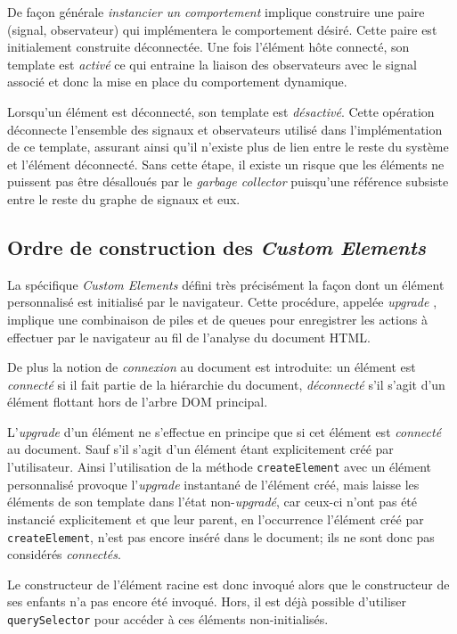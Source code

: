 De façon générale \emph{instancier un comportement} implique construire une paire (signal, observateur) qui implémentera le comportement désiré. Cette paire est initialement construite déconnectée. Une fois l'élément hôte connecté, son template est \emph{activé} ce qui entraine la liaison  des observateurs avec le signal associé et donc la mise en place du comportement dynamique.

Lorsqu'un élément est déconnecté, son template est \emph{désactivé}. Cette opération déconnecte l'ensemble des signaux et observateurs utilisé dans l'implémentation de ce template, assurant ainsi qu'il n'existe plus de lien entre le reste du système et l'élément déconnecté. Sans cette étape, il existe un risque que les éléments ne puissent pas être désalloués par le \emph{garbage collector} puisqu'une référence subsiste entre le reste du graphe de signaux et eux.

\subsection{Ordre de construction des \emph{Custom Elements}}

La spécifique \emph{Custom Elements} \cite{w3c-custom-elements} défini très précisément la façon dont un élément personnalisé est initialisé par le navigateur. Cette procédure, appelée \emph{upgrade} \cite[\small 2.5 Upgrades]{w3c-custom-elements}, implique une combinaison de piles et de queues pour enregistrer les actions à effectuer par le navigateur au fil de l'analyse du document HTML.

De plus la notion de \emph{connexion} au document est introduite: un élément est \emph{connecté} si il fait partie de la hiérarchie du document, \emph{déconnecté} s'il s'agit d'un élément flottant hors de l'arbre DOM principal.

L'\emph{upgrade} d'un élément ne s'effectue en principe que si cet élément est \emph{connecté} au document. Sauf s'il s'agit d'un élément étant explicitement créé par l'utilisateur. Ainsi l'utilisation de la méthode \texttt{createElement} avec un élément personnalisé provoque l'\emph{upgrade} instantané de l'élément créé, mais laisse les éléments de son template dans l'état non-\emph{upgradé}, car ceux-ci n'ont pas été instancié explicitement et que leur parent, en l'occurrence l'élément créé par \texttt{createElement}, n'est pas encore inséré dans le document; ils ne sont donc pas considérés \emph{connectés}.

Le constructeur de l'élément racine est donc invoqué alors que le constructeur de ses enfants n'a pas encore été invoqué. Hors, il est déjà possible d'utiliser \texttt{querySelector} pour accéder à ces éléments non-initialisés.

